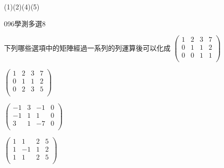 \begin{QUESTIONS}
\begin{QUESTION}
        \begin{QFROMS}
        \end{QFROMS}
        \begin{QTAGS}\end{QTAGS}
        \begin{QANS}
            (1)(2)(4)(5)
        \end{QANS}
        \begin{QSOLLIST}
        \end{QSOLLIST}
        \begin{QEMPTYSPACE}
        \end{QEMPTYSPACE}
    \end{QUESTION}
    \begin{QUESTION}
        \begin{ExamInfo}{096}{學測}{多選}{8}
        \end{ExamInfo}
        \begin{ExamAnsRateInfo}{30}{36}{32}{22}
        \end{ExamAnsRateInfo}
        \begin{QBODY}
			下列哪些選項中的矩陣經過一系列的列運算後可以化成
			$\left( \begin{array}{cccc} 1 & 2 & 3 & 7 \\0 & 1 & 1 & 2 \\0 & 0 & 1 & 1 \\\end{array}\right)$

			\begin{QOPS} 
				\QOP $\left( \begin{array}{cccc} 1 & 2 & 3 & 7 \\0 & 1 & 1 & 2 \\0 & 2 & 3 & 5 \\\end{array}\right)$

				\QOP $\left( \begin{array}{cccc} -1 & 3 & -1 & 0 \\-1 & 1 & 1 & 0 \\3 & 1 & -7 & 0 \\\end{array}\right)$

				\QOP $\left( \begin{array}{cccc} 1 & 1 & 2 & 5 \\1 & -1 & 1 & 2 \\1 & 1 & 2 & 5 \\\end{array}\right)$


\end{QOPS}
\end{QBODY}
\end{QUESTION}
\end{QUESTIONS}
